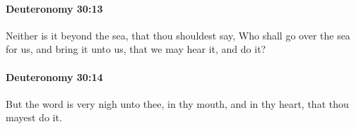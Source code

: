 		\paragraph{Deuteronomy 30:13} %
			\label{DEUTERONOMY-30-13}

			Neither is it beyond the sea, that thou shouldest say, Who shall go over the sea for us, and bring it unto us, that we may hear it, and do it?


		\paragraph{Deuteronomy 30:14} %
			\label{DEUTERONOMY-30-14}

			But the word is very nigh unto thee, in thy mouth, and in thy heart, that thou mayest do it.


